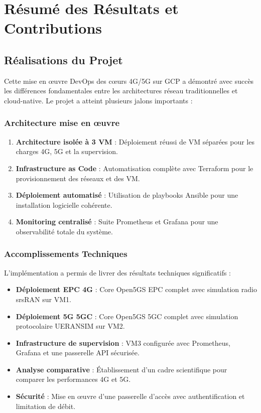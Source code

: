 \documentclass[12pt,a4paper]{report}
\begin{document}
\section{Résumé des Résultats et Contributions}

\subsection{Réalisations du Projet}

Cette mise en œuvre DevOps des cœurs 4G/5G sur GCP a démontré avec succès les différences fondamentales entre les architectures réseau traditionnelles et cloud-native. Le projet a atteint plusieurs jalons importants :

\subsubsection{Architecture mise en œuvre}

\begin{enumerate}
    \item \textbf{Architecture isolée à 3 VM} : Déploiement réussi de VM séparées pour les charges 4G, 5G et la supervision.
    \item \textbf{Infrastructure as Code} : Automatisation complète avec Terraform pour le provisionnement des réseaux et des VM.
    \item \textbf{Déploiement automatisé} : Utilisation de playbooks Ansible pour une installation logicielle cohérente.
    \item \textbf{Monitoring centralisé} : Suite Prometheus et Grafana pour une observabilité totale du système.
\end{enumerate}

\subsubsection{Accomplissements Techniques}

L'implémentation a permis de livrer des résultats techniques significatifs :

\begin{itemize}
    \item \textbf{Déploiement EPC 4G} : Core Open5GS EPC complet avec simulation radio srsRAN sur VM1.
    \item \textbf{Déploiement 5G 5GC} : Core Open5GS 5GC complet avec simulation protocolaire UERANSIM sur VM2.
    \item \textbf{Infrastructure de supervision} : VM3 configurée avec Prometheus, Grafana et une passerelle API sécurisée.
    \item \textbf{Analyse comparative} : Établissement d'un cadre scientifique pour comparer les performances 4G et 5G.
    \item \textbf{Sécurité} : Mise en œuvre d'une passerelle d'accès avec authentification et limitation de débit.
\end{itemize}
\end{document}

